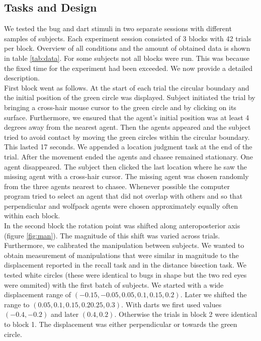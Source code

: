 \documentclass[10pt]{article}
\begin{document}
\subsection*{Tasks and Design}
We tested the bug and dart stimuli in two separate sessions with different samples of subjects. 
Each experiment session consisted of 3 blocks with 42 trials per block.  
Overview of all conditions and the amount of obtained data is shown in table \ref{tab:data}. For some subjects not all blocks were run. This was  because the fixed time for the experiment had been exceeded. 
We now provide a detailed description. \\
First block went as follows. 
At the start of each trial the circular boundary and the initial position of the green circle was displayed. 
Subject initiated the trial by bringing a cross-hair mouse cursor to the green circle and by clicking on its surface. 
Furthermore, we ensured that the agent's initial position was at least 4 degrees away from the nearest agent. 
Then the agents appeared and the subject tried to avoid contact by moving the green circles within the circular boundary. 
This lasted 17 seconds. 
We appended a location judgment task at the end of the trial. 
After the movement ended the agents and chasee remained stationary. 
One agent disappeared. 
The subject then clicked the last location where he saw the missing agent with a cross-hair cursor. 
The missing agent was chosen randomly from the three agents nearest to chasee. 
Whenever possible the computer program tried to select an agent that did not overlap with others and so that perpendicular and wolfpack agents were chosen approximately equally often within each block. \\
In the second block the rotation point was shifted along anteroposterior axis (figure \ref{fig:man}). 
The magnitude of this shift was varied across trials. 
Furthermore, we calibrated the manipulation between subjects. 
We wanted to obtain measurement of manipulations that were similar in magnitude to the displacement reported in the recall task and in the distance bisection task. 
We tested white circles (these were identical to bugs in shape but the two red eyes were ommited) with the first batch of subjects. 
We started with a wide displacement range of $(-0.15, -0.05, 0.05, 0.1, 0.15, 0.2)$. 
Later we shifted the range to $(0.05, 0.1,0.15, 0.2 0.25,0.3)$. 
With darts we first used values $(-0.4, -0.2)$ and later $(0.4, 0.2)$. 
Otherwise the trials in block 2 were identical to block 1. 
The displacement was either perpendicular or towards the green circle. 
\end{document}
